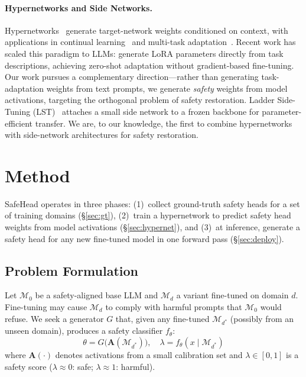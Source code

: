 \documentclass[11pt]{article}
\newcommand{\method}{SafeHead}
\begin{document}
\paragraph{Hypernetworks and Side Networks.}
Hypernetworks~\cite{ha2017hypernetworks, chauhan2024brief} generate target-network weights conditioned on context, with applications in continual learning~\cite{vonoswald2020continual} and multi-task adaptation~\cite{navon2023equivariant}. Recent work has scaled this paradigm to LLMs: \citet{liang2025dragdrop} generate LoRA parameters directly from task descriptions, achieving zero-shot adaptation without gradient-based fine-tuning. Our work pursues a complementary direction---rather than generating task-adaptation weights from text prompts, we generate \textit{safety} weights from model activations, targeting the orthogonal problem of safety restoration.
Ladder Side-Tuning (LST)~\cite{sung2022lst} attaches a small side network to a frozen backbone for parameter-efficient transfer. We are, to our knowledge, the first to combine hypernetworks with side-network architectures for safety restoration.


\section{Method}
\label{sec:method}

\method{} operates in three phases: (1)~collect ground-truth safety heads for a set of training domains (\S\ref{sec:gt}), (2)~train a hypernetwork to predict safety head weights from model activations (\S\ref{sec:hypernet}), and (3)~at inference, generate a safety head for any new fine-tuned model in one forward pass (\S\ref{sec:deploy}).

\subsection{Problem Formulation}

Let $\mathcal{M}_0$ be a safety-aligned base LLM and $\mathcal{M}_d$ a variant fine-tuned on domain $d$. Fine-tuning may cause $\mathcal{M}_d$ to comply with harmful prompts that $\mathcal{M}_0$ would refuse. We seek a generator $G$ that, given any fine-tuned $\mathcal{M}_{d^*}$ (possibly from an unseen domain), produces a safety classifier $f_\theta$:
\begin{equation}
    \theta = G\!\big(\mathbf{A}(\mathcal{M}_{d^*})\big), \quad \lambda = f_\theta(x \mid \mathcal{M}_{d^*})
\end{equation}
where $\mathbf{A}(\cdot)$ denotes activations from a small calibration set and $\lambda \in [0,1]$ is a safety score ($\lambda \approx 0$: safe; $\lambda \approx 1$: harmful).
\end{document}

